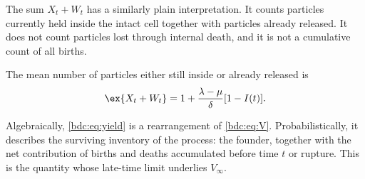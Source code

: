 The sum $X_t+W_t$ has a similarly plain interpretation. It counts particles
currently held inside the intact cell together with particles already released.
It does not count particles lost through internal death, and it is not a
cumulative count of all births.

\begin{corollary}
\label{bdc:cor:yield}
The mean number of particles either still inside or already released is
\begin{equation}
\label{bdc:eq:yield}
\ex{X_t+W_t}
=1+\frac{\lambda-\mu}{\delta}[1-I(t)].
\end{equation}
\end{corollary}

Algebraically, \cref{bdc:eq:yield} is a rearrangement of
\cref{bdc:eq:V}. Probabilistically, it describes the surviving inventory of the
process: the founder, together with the net contribution of births and deaths
accumulated before time $t$ or rupture. This is the quantity whose late-time
limit underlies $V_\infty$.

\FloatBarrier
